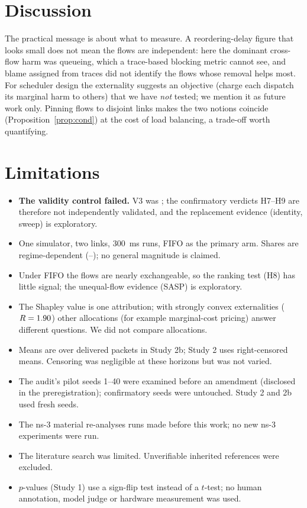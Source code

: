 \documentclass[11pt]{article}
\begin{document}
\section{Discussion}
The practical message is about what to measure. A reordering-delay figure that looks small does not mean the flows are independent: here the dominant cross-flow harm was queueing, which a trace-based blocking metric cannot see, and blame assigned from traces did not identify the flows whose removal helps most. For scheduler design the externality suggests an objective (charge each dispatch its marginal harm to others) that we have \emph{not} tested; we mention it as future work only. Pinning flows to disjoint links makes the two notions coincide (Proposition~\ref{prop:cond}) at the cost of load balancing, a trade-off worth quantifying.

\section{Limitations}
\begin{itemize}
  \item \textbf{The validity control failed.} V3 was \SBVthreeStatus{}; the confirmatory verdicts H7--H9 are therefore not independently validated, and the replacement evidence (identity, sweep) is exploratory.
  \item One simulator, two links, 300~ms runs, FIFO as the primary arm. Shares are regime-dependent (\SBBCrossMin{}--\SBBCrossMax{}); no general magnitude is claimed.
  \item Under FIFO the flows are nearly exchangeable, so the ranking test (H8) has little signal; the unequal-flow evidence (SASP) is exploratory.
  \item The Shapley value is one attribution; with strongly convex externalities ($R=1.90$) other allocations (for example marginal-cost pricing) answer different questions. We did not compare allocations.
  \item Means are over delivered packets in Study 2b; Study 2 uses right-censored means. Censoring was negligible at these horizons but was not varied.
  \item The audit's pilot seeds 1--40 were examined before an amendment (disclosed in the preregistration); confirmatory seeds were untouched. Study 2 and 2b used fresh seeds.
  \item The ns-3 material re-analyses runs made before this work; no new ns-3 experiments were run.
  \item The literature search was limited. Unverifiable inherited references were excluded.
  \item $p$-values (Study 1) use a sign-flip test instead of a $t$-test; no human annotation, model judge or hardware measurement was used.
\end{itemize}
\end{document}
